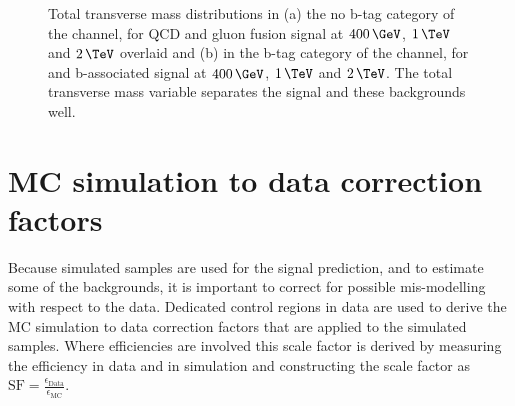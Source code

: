 \begin{figure}[h!]
\begin{center}
\end{center}
\caption[Total transverse mass distributions in the no b-tag category of the
\tautau channel for QCD and gluon fusion signal, and in the b-tag category
of the \emu channel, for \ttbar and b-associated signal.]{Total transverse mass distributions in (a) the no b-tag category of the \tautau
channel, for QCD and gluon fusion signal at $400\,\GeV$, $1\,\TeV$ and $2\,\TeV$ overlaid and (b) in the b-tag
category of the \emu channel, for \ttbar and b-associated signal at $400\,\GeV$, $1\,\TeV$ and $2\,\TeV$. 
The total transverse mass variable separates the signal and these backgrounds well.}
\label{fig:mttot_sigseps}
\end{figure}



\section{\acl{MC} simulation to data correction factors}
\label{sec:mssm_mccorrs}
Because simulated samples are used for the signal prediction, and 
to estimate some of the backgrounds, it is important to correct for possible 
mis-modelling with respect to the data. Dedicated control regions in
data are used to derive the \ac{MC} simulation to data correction factors
that are applied to the simulated samples. Where efficiencies
are involved this scale factor is derived by measuring the efficiency
in data and in simulation and constructing the scale factor as $\text{SF}=\frac{\epsilon_{\text{Data}}}{\epsilon_{\text{MC}}}$.

